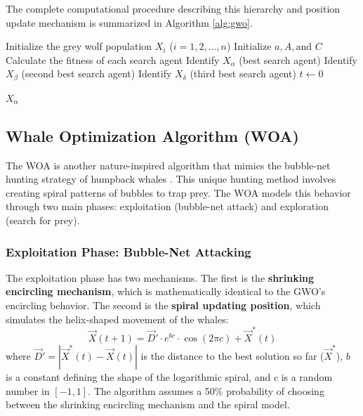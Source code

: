 The complete computational procedure describing this hierarchy and position update mechanism is summarized in Algorithm \ref{alg:gwo}.

\begin{algorithm}[H]
\SetAlgoLined
\caption{Grey Wolf Optimizer (GWO)}
\label{alg:gwo}

Initialize the grey wolf population $X_i$ ($i = 1, 2, \dots, n$)\;
Initialize $a, A, \text{and } C$\;
Calculate the fitness of each search agent\;
Identify $X_\alpha$ (best search agent)\;
Identify $X_\beta$ (second best search agent)\;
Identify $X_\delta$ (third best search agent)\;
$t \leftarrow 0$\;

\Return $X_\alpha$\;
\end{algorithm}

\subsection{Whale Optimization Algorithm (WOA)}
The WOA is another nature-inspired algorithm that mimics the bubble-net hunting strategy of humpback whales  \cite{woa}. This unique hunting method involves creating spiral patterns of bubbles to trap prey. The WOA models this behavior through two main phases: exploitation (bubble-net attack) and exploration (search for prey).

\subsubsection{Exploitation Phase: Bubble-Net Attacking}
The exploitation phase has two mechanisms. The first is the \textbf{shrinking encircling mechanism}, which is mathematically identical to the GWO's encircling behavior. The second is the \textbf{spiral updating position}, which simulates the helix-shaped movement of the whales:
\begin{equation}
    \vec{X}(t+1) = \vec{D}' \cdot e^{bc} \cdot \cos(2\pi c) + \vec{X}^*(t)
\end{equation}
where $\vec{D}' = |\vec{X}^*(t) - \vec{X}(t)|$ is the distance to the best solution so far ($\vec{X}^*$), $b$ is a constant defining the shape of the logarithmic spiral, and $c$ is a random number in $[-1, 1]$. The algorithm assumes a 50\% probability of choosing between the shrinking encircling mechanism and the spiral model.

